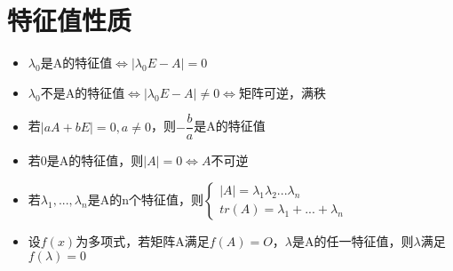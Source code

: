 \section{特征值性质}
\begin{itemize}
    \item \(\lambda_0\)是A的特征值\(\Leftrightarrow |\lambda_0E - A| = 0\)
    \item \(\lambda_0\)不是A的特征值\(\Leftrightarrow |\lambda_0E - A| \neq 0 \Leftrightarrow\)矩阵可逆，满秩
    \item 若\(|aA + bE| = 0, a \neq 0\)，则\(-\dfrac{b}{a}\)是A的特征值
    \item 若0是A的特征值，则\(|A| = 0 \Leftrightarrow A\text{不可逆}\)
    \item 若\(\lambda_1, ..., \lambda_n\)是A的n个特征值，则\(\begin{cases}
        |A| = \lambda_1\lambda_2...\lambda_n \\ 
        tr(A) = \lambda_1 + ... + \lambda_n
    \end{cases}\)
    \item 设\(f(x)\)为多项式，若矩阵A满足\(f(A) = O\)，\(\lambda\)是A的任一特征值，则\(\lambda\)满足\(f(\lambda) = 0\)
\end{itemize}

